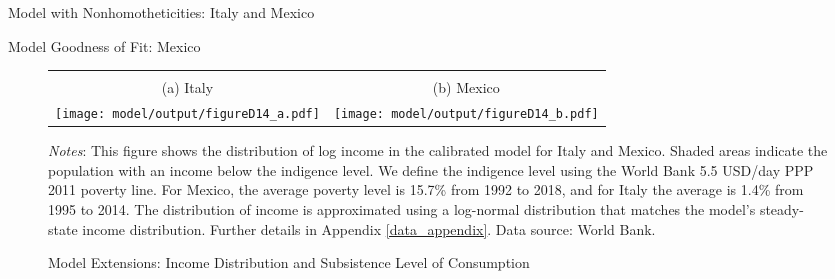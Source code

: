 \documentclass[12pt]{article}
\begin{document}
\begin{spacing}{1.5}
\begin{table}[H]
\begin{centering}
\caption{Model with Nonhomotheticities: Italy and Mexico}\label{param_nh}

\end{centering}
\end{table}

\begin{table}[H]
\begin{centering}
\caption{Model Goodness of Fit: Mexico}\label{mex_fit}

\end{centering}
\end{table}

\begin{figure}[H]
\caption{Model Extensions: Income Distribution and Subsistence Level of Consumption}
\label{fig: nonh_ap}
\begin{tabular}{cc}
\vspace{-.5em} \\
(a) Italy & (b) Mexico \\
 \texttt{[image: model/output/figureD14\_a.pdf]} &
 \texttt{[image: model/output/figureD14\_b.pdf]} \\
\end{tabular}
\raggedright{}\textit{\footnotesize{}Notes}{: \footnotesize{
This figure shows the distribution of log income in the calibrated model for Italy and Mexico. Shaded areas indicate the population with an income below the indigence level. We define the indigence level using the World Bank 5.5 USD/day PPP 2011 poverty line. For Mexico, the average poverty level is 15.7\% from 1992 to 2018, and for Italy the average is 1.4\% from 1995 to 2014. The distribution of income is approximated using a log-normal distribution that matches the model's steady-state income distribution. Further details in Appendix \ref{data_appendix}.
Data source: World Bank.}}{\footnotesize\par}
\end{figure}



\end{spacing}
\end{document}
